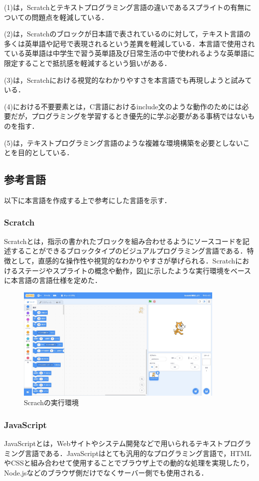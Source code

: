 \documentclass[10pt,a4j]{ltjsarticle}
\begin{document}
(1)は，Scratchとテキストプログラミング言語の違いであるスプライトの有無についての問題点を軽減している．

(2)は，Scratchのブロックが日本語で表されているのに対して，テキスト言語の多くは英単語や記号で表現されるという差異を軽減している．本言語で使用されている英単語は中学生で習う英単語及び日常生活の中で使われるような英単語に限定することで抵抗感を軽減するという狙いがある．

(3)は，Scratchにおける視覚的なわかりやすさを本言語でも再現しようと試みている．

(4)における不要要素とは，C言語におけるinclude文のような動作のためには必要だが，プログラミングを学習するとき優先的に学ぶ必要がある事柄ではないものを指す．

(5)は，テキストプログラミング言語のような複雑な環境構築を必要としないことを目的としている．

\subsection{参考言語}
以下に本言語を作成する上で参考にした言語を示す．

\subsubsection{Scratch}
Scratchとは，指示の書かれたブロックを組み合わせるようにソースコードを記述することができるブロックタイプのビジュアルプログラミング言語である．特徴として，直感的な操作性や視覚的なわかりやすさが挙げられる．Scratchにおけるステージやスプライトの概念や動作，図\ref{fig:scratch}に示したような実行環境をベースに本言語の言語仕様を定めた．

\begin{figure}[H]
  \centering
  \includegraphics[width=100mm]{images/scratch.pdf}
  \caption{Scrachの実行環境}
  \label{fig:scratch}
\end{figure}

\subsubsection{JavaScript}
JavaScriptとは，Webサイトやシステム開発などで用いられるテキストプログラミング言語である．JavaScriptはとても汎用的なプログラミング言語で，HTMLやCSSと組み合わせて使用することでブラウザ上での動的な処理を実現したり，Node.jsなどのブラウザ側だけでなくサーバー側でも使用される．
\end{document}
